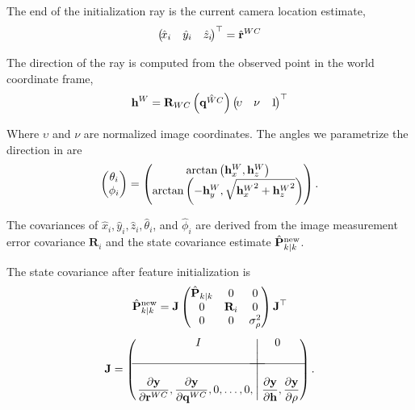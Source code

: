 \documentclass[twoside]{article}
\begin{document}
The end of the initialization ray is the current camera location estimate,
\begin{equation}
\left(\!\begin{matrix}\hat{x}_i &\hat{y}_i &\hat{z}_i\end{matrix}\!\right)^\top = \hat{{\bf r}}^{WC} 
\end{equation}

The direction of the ray is computed from the observed point in the world coordinate frame,
\begin{equation}
{\bf h}^W={\bf R}_{WC}\left(\hat{{\bf q}^{WC}}\right)\left(\!\begin{matrix}\upsilon & \nu & 1\end{matrix}\!\right)^\top
\end{equation}

Where $\upsilon$ and $\nu$ are normalized image coordinates. The angles we parametrize the direction in are 
\begin{equation}
\left(\begin{matrix}\theta_i \cr \phi_i\end{matrix}\right) = \left(\begin{matrix}\arctan\left({\bf h}_{x}^W,{\bf h}_{z}^W\right) \cr \arctan\left(-{\bf h}_{y}^W, \sqrt{{{\bf h}_{x}^W}^2+{{\bf h}_{z}^W}^2}\right) \end{matrix}\right) . 
\end{equation}

The covariances of $\hat{x}_i, \hat{y}_i, \hat{z}_i, \hat{\theta}_i$, and $\hat{\phi}_i$ are derived from the image measurement error covariance $\textbf{R}_i$ and the state covariance estimate $\hat{{\bf P}}^{{\rm new}}_{k\vert k}$.

The state covariance after feature initialization is
\begin{equation}
\hat{{\bf P}}^{{\rm new}}_{k\vert k} = {\bf J}\left(\begin{matrix}\hat{{\bf P}}_{k\vert k} & 0 & 0 \cr 0 & {\bf R}_i & 0 \cr 0 & 0 &\sigma_{\rho}^2\end{matrix}\right){\bf J}^\top
\end{equation}
\begin{equation}
 {\bf J} = \left(\left.\begin{matrix}I\cr\cr\hline\cr \displaystyle{\partial {\bf y}\over \partial{\bf r}^{WC}}, {\partial {\bf y}\over \partial{\bf q}^{WC}},0,\ldots,0,\;\;\end{matrix}\!\!\right\vert \!\!\! \begin{matrix}0 \cr\cr\hline\cr \;\;\displaystyle{\partial {\bf y} \over \partial{\bf h}}, {\partial {\bf y} \over \partial\rho}\end{matrix}\right) .
\end{equation}
\end{document}

